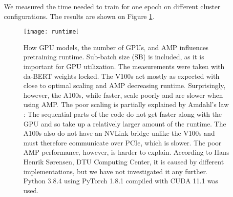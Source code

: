 \documentclass[main.tex]{subfiles}
\begin{document}
We measured the time needed to train for one epoch on different cluster configurations.
The results are shown on Figure \ref{fig:runtime}.
\begin{figure}[H]
    \centering
    \texttt{[image: runtime]}
    \caption{
        How GPU models, the number of GPUs, and AMP influences pretraining runtime.
        Sub-batch size (SB) is included, as it is important for GPU utilization.
        The measurements were taken with da-BERT weights locked.
        The V100s act mostly as expected with close to optimal scaling and AMP decreasing runtime.
        Surprisingly, however, the A100s, while faster, scale poorly and are slower when using AMP.
        The poor scaling is partially explained by Amdahl's law \cite{klein2011amdahl}: The sequential parts of the code do not get faster along with the GPU and so take up a relatively larger amount of the runtime.
        The A100s also do not have an NVLink bridge unlike the V100s and must therefore communicate over PCIe, which is slower.
        The poor AMP performance, however, is harder to explain.
        According to Hans Henrik Sørensen, DTU Computing Center, it is caused by different  implementations, but we have not investigated it any further.
        Python 3.8.4 using PyTorch 1.8.1 compiled with CUDA 11.1 was used.
    }
    \label{fig:runtime}
\end{figure}\noindent
\end{document}
